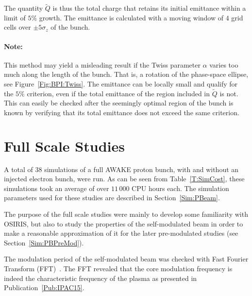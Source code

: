 The quantity $\tilde{Q}$ is thus the total charge that retains its initial emittance within a limit of $5\%$ growth.
The emittance is calculated with a moving window of $4$ grid cells over $\pm 5\sigma_z$ of the bunch.

\paragraph{Note:} This method may yield a misleading result if the Twiss parameter $\alpha$ varies too much along the length of the bunch.
That is, a rotation of the phase-space ellipse, see Figure~\ref{Fig:BPI:Twiss}.
The emittance can be locally small and qualify for the $5\%$ criterion, even if the total emittance of the region included in $\tilde{Q}$ is not.
This can easily be checked after the seemingly optimal region of the bunch is known by verifying that its total emittance does not exceed the same criterion.

\section{Full Scale Studies}
\label{SimA:FullScale}

A total of 38 simulations of a full AWAKE proton bunch, with and without an injected electron bunch, were run.
As can be seen from Table~\ref{T:SimCost}, these simulations took an average of over $11\,000$ CPU hours each.
The simulation parameters used for these studies are described in Section~\ref{Sim:PBeam}.

The purpose of the full scale studies were mainly to develop some familiarity with OSIRIS, but also to study the properties of the self-modulated beam in order to make a reasonable approximation of it for the later pre-modulated studies (see Section~\ref{Sim:PBPreMod}).

The modulation period of the self-modulated beam was checked with Fast Fourier Transform (FFT)~\cite{van_loan:1992}.
The FFT revealed that the core modulation frequency is indeed the characteristic frequency of the plasma as presented in Publication~\ref{Pub:IPAC15}.

